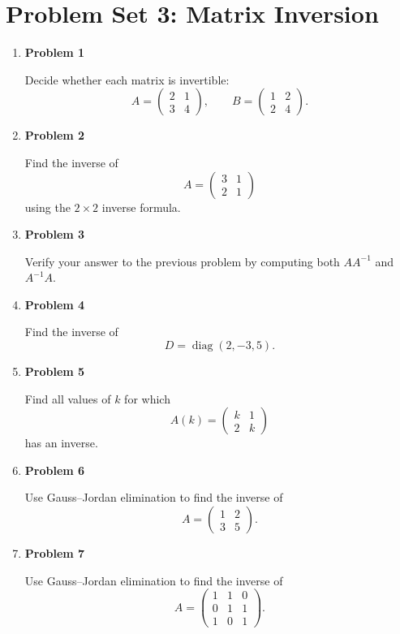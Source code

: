 \section{Problem Set 3: Matrix Inversion}

\begin{enumerate}
\item \textbf{Problem 1}\par
Decide whether each matrix is invertible:
\[
A=\begin{pmatrix}2&1\\3&4\end{pmatrix},
\qquad
B=\begin{pmatrix}1&2\\2&4\end{pmatrix}.
\]

\item \textbf{Problem 2}\par
Find the inverse of
\[
A=\begin{pmatrix}3&1\\2&1\end{pmatrix}
\]
using the \(2\times2\) inverse formula.

\item \textbf{Problem 3}\par
Verify your answer to the previous problem by computing both \(AA^{-1}\) and \(A^{-1}A\).

\item \textbf{Problem 4}\par
Find the inverse of
\[
D=\operatorname{diag}(2,-3,5).
\]

\item \textbf{Problem 5}\par
Find all values of \(k\) for which
\[
A(k)=\begin{pmatrix}
k&1\\
2&k
\end{pmatrix}
\]
has an inverse.

\item \textbf{Problem 6}\par
Use Gauss--Jordan elimination to find the inverse of
\[
A=\begin{pmatrix}
1&2\\
3&5
\end{pmatrix}.
\]

\item \textbf{Problem 7}\par
Use Gauss--Jordan elimination to find the inverse of
\[
A=\begin{pmatrix}
1&1&0\\
0&1&1\\
1&0&1
\end{pmatrix}.
\]


\end{enumerate}
